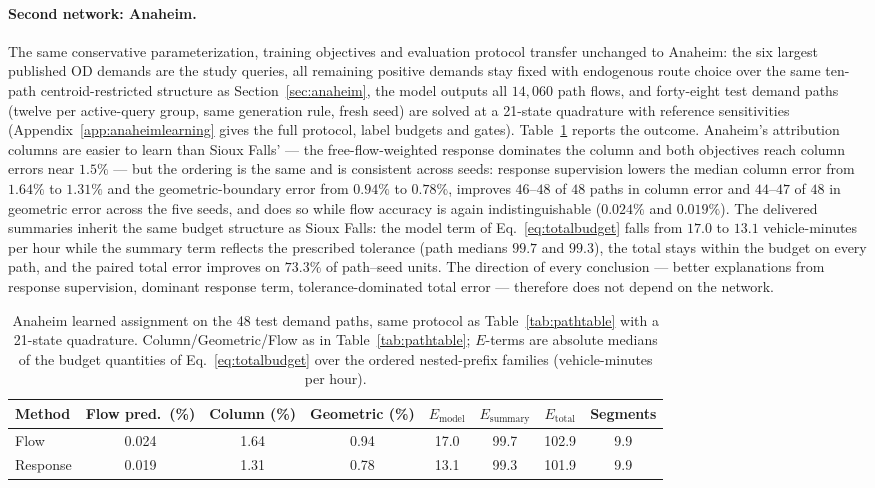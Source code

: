 \paragraph{Second network: Anaheim.}
The same conservative parameterization, training objectives and
evaluation protocol transfer unchanged to Anaheim: the six largest
published OD demands are the study queries, all remaining positive
demands stay fixed with endogenous route choice over the same ten-path
centroid-restricted structure as Section~\ref{sec:anaheim}, the model
outputs all $14{,}060$ path flows, and forty-eight test demand paths
(twelve per active-query group, same generation rule, fresh seed) are
solved at a 21-state quadrature with reference sensitivities
(Appendix~\ref{app:anaheimlearning} gives the full protocol, label
budgets and gates). Table~\ref{tab:anaheimlearning} reports the
outcome. Anaheim's attribution columns are easier to learn than Sioux
Falls' --- the free-flow-weighted response dominates the column and
both objectives reach column errors near $1.5\%$ --- but the ordering
is the same and is consistent across seeds: response supervision
lowers the median column error from $1.64\%$ to $1.31\%$ and the
geometric-boundary error from $0.94\%$ to $0.78\%$, improves $46$--$48$
of $48$ paths in column error and $44$--$47$ of $48$ in geometric
error across the five seeds, and does so while flow
accuracy is again indistinguishable ($0.024\%$ and $0.019\%$). The
delivered summaries inherit the same budget structure as Sioux Falls:
the model term of Eq.~\eqref{eq:totalbudget} falls from $17.0$ to
$13.1$ vehicle-minutes per hour while the summary term reflects the
prescribed tolerance (path medians $99.7$ and $99.3$), the total stays
within the budget on every path, and the paired total error improves on
$73.3\%$ of path--seed units. The direction of every conclusion ---
better explanations from response supervision, dominant response term,
tolerance-dominated total error --- therefore does not depend on the
network.
\begin{table}[t]\centering\footnotesize
\caption{Anaheim learned assignment on the 48 test demand paths, same
protocol as Table~\ref{tab:pathtable} with a 21-state quadrature.
Column/Geometric/Flow as in Table~\ref{tab:pathtable}; $E$-terms are
absolute medians of the budget quantities of
Eq.~\eqref{eq:totalbudget} over the ordered nested-prefix families
(vehicle-minutes per hour).}\label{tab:anaheimlearning}
\setlength{\tabcolsep}{4pt}
\begin{tabular*}{\tblwidth}{@{\extracolsep{\fill}}lccccccc}
\toprule
Method & Flow pred.\ (\%) & Column (\%) & Geometric (\%) & $E_{\mathrm{model}}$ & $E_{\mathrm{summary}}$ & $E_{\mathrm{total}}$ & Segments\\
\midrule
Flow & 0.024 & 1.64 & 0.94 & 17.0 & 99.7 & 102.9 & 9.9\\
Response & 0.019 & 1.31 & 0.78 & 13.1 & 99.3 & 101.9 & 9.9\\
\bottomrule\end{tabular*}\end{table}
